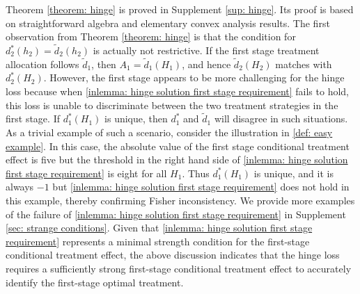 \documentclass[preprint] {imsart}
\begin{document}
{  %
  Theorem \ref{theorem: hinge} is proved in Supplement \ref{sup: hinge}. Its proof is based on straightforward algebra and elementary convex analysis results. The first observation from Theorem \ref{theorem: hinge} is that 
  the condition for $d_2^*(h_2)=\tilde d_2(h_2)$ is actually not restrictive. If the first stage treatment allocation follows  $\tilde d_1$, then $A_1=\tilde d_1(H_1)$, and hence  $\tilde d_2(H_2)$ matches with $d^*_2(H_2)$.  However,  the first stage appears to be more challenging for the hinge loss because when \eqref{inlemma: hinge solution first stage requirement} fails to hold, this loss is unable to discriminate between the two treatment strategies in the first stage. If $d_1^*(H_1)$ is unique, then $d_1^*$ and $\tilde d_1$ will disagree in such situations. 
As a trivial example of such a scenario, consider the illustration in \eqref{def: easy example}.  \label{page: Theorem 2 patho}
    In this case,  the absolute value of the first stage conditional treatment effect is five  but the threshold in the right hand side of \eqref{inlemma: hinge solution first stage requirement} is eight for all $H_1$. Thus   $d_1^*(H_1)$ is unique, and it is always $-1$ but \eqref{inlemma: hinge solution first stage requirement} does not hold in this example, thereby confirming Fisher inconsistency.   We provide more examples of the failure of  \eqref{inlemma: hinge solution first stage requirement} in Supplement \ref{sec: strange conditions}.  Given that \eqref{inlemma: hinge solution first stage requirement} represents a minimal strength condition for the first-stage conditional treatment effect, the above discussion indicates that the hinge loss requires a sufficiently strong first-stage conditional treatment effect to accurately identify the first-stage optimal treatment. 


  
    


}
\end{document}
